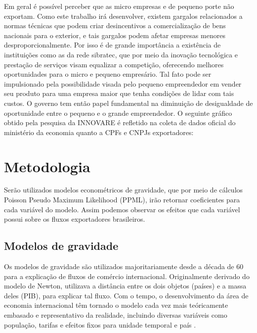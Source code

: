 \documentclass[12pt, a4paper]{article}
\begin{document}
Em geral é possível perceber que as micro empresas e de pequeno porte não exportam. Como este trabalho irá desenvolver, existem gargalos relacionados a normas técnicas que podem criar desincentivos a comercialização de bens nacionais para o exterior, e tais gargalos podem afetar empresas menores desproporcionalmente. Por isso é de grande importância a existência de instituições como as da rede sibratec, que por meio da inovação tecnológica e prestação de serviços visam equalizar a competição, oferecendo melhores oportunidades para o micro e pequeno empresário. Tal fato pode ser impulsionado pela possibilidade visada pelo pequeno empreendedor em vender seu produto para uma empresa maior que tenha condições de lidar com tais custos. O governo tem então papel fundamental na diminuição de desigualdade de oportunidade entre o pequeno e o grande empreendedor. O seguinte gráfico obtido pela pesquisa da INNOVARE é refletido na coleta de dados oficial do ministério da economia quanto a CPFs e CNPJs exportadores:





\newpage

\section{Metodologia}

Serão utilizados modelos econométricos de gravidade, que por meio de cálculos Poisson Pseudo Maximum Likelihood (PPML), irão retornar coeficientes para cada variável do modelo. Assim podemos observar os efeitos que cada variável possui sobre os fluxos exportadores brasileiros.

\subsection{Modelos de gravidade}

Os modelos de gravidade são utilizados majoritariamente desde a década de 60 para a explicação de fluxos de comércio internacional. Originalmente derivado do modelo de Newton, utilizava a distância entre os dois objetos (países) e a massa deles (PIB), para explicar tal fluxo. Com o tempo, o desenvolvimento da área de economia internacional têm tornado o modelo cada vez mais teóricamente embasado e representativo da realidade, incluindo diversas variáveis como população, tarifas e efeitos fixos para unidade temporal e país \cite{nascimento2013evoluccao}.
\end{document}
